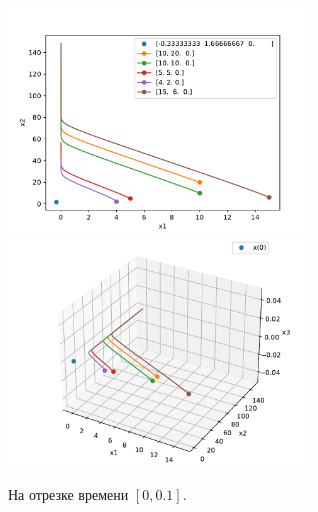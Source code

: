     \begin{figure}[H]
        \includegraphics[width=8cm]{pictures/x3_0phase.pdf}
        \includegraphics[width=8cm]{pictures/x3_0phase3.pdf}
        \caption{На отрезке времени \( [0, 0.1] \).}
    \end{figure}

